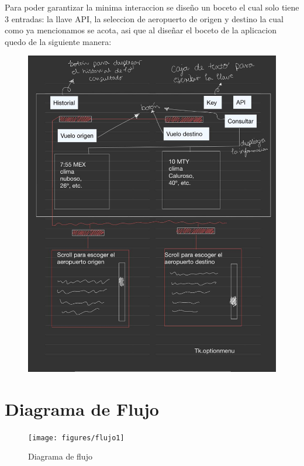 \documentclass[12pt]{article}
\begin{document}
Para poder garantizar la minima interaccion se diseño un boceto el cual solo tiene 3 entradas: la llave API, la seleccion de aeropuerto de origen y destino la cual como ya mencionamos se acota, asi que al diseñar el boceto de la aplicacion quedo de la siguiente manera:
\newpage
\begin{figure}[h!]
  \centering
  \includegraphics[scale=0.38]{figures/boceto.jpeg}
  \caption{\label{fig:label} }
\end{figure}
\newpage
\section{Diagrama de Flujo}
\begin{figure}[h!]
  \centering
  \texttt{[image: figures/flujo1]}
  \caption{Diagrama de flujo}
\end{figure}
\end{document}
